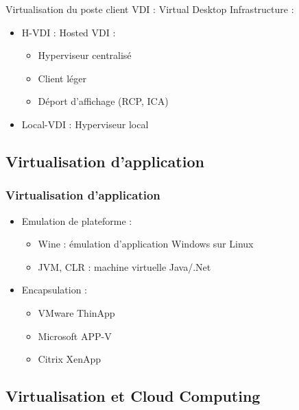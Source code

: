 \begin{frame}{Virtualisation du poste client}
VDI : Virtual Desktop Infrastructure :
\begin{itemize}
\item H-VDI : Hosted VDI :
\begin{itemize}
\item Hyperviseur centralisé
\item Client léger
\item Déport d'affichage (RCP, ICA)
\end{itemize}

\item Local-VDI : Hyperviseur local
\end{itemize}
\end{frame}

\subsection{Virtualisation d'application}

\begin{frame}
\frametitle{Virtualisation d'application}
\begin{itemize}
\item Emulation de plateforme : 
\begin{itemize}
\item Wine : émulation d'application Windows sur Linux
\item JVM, CLR : machine virtuelle Java/.Net
\end{itemize}
\item Encapsulation :
\begin{itemize}
\item  VMware ThinApp
\item Microsoft APP-V
\item Citrix XenApp
\end{itemize}
\end{itemize}
\end{frame}
\subsection{Virtualisation et Cloud Computing}

